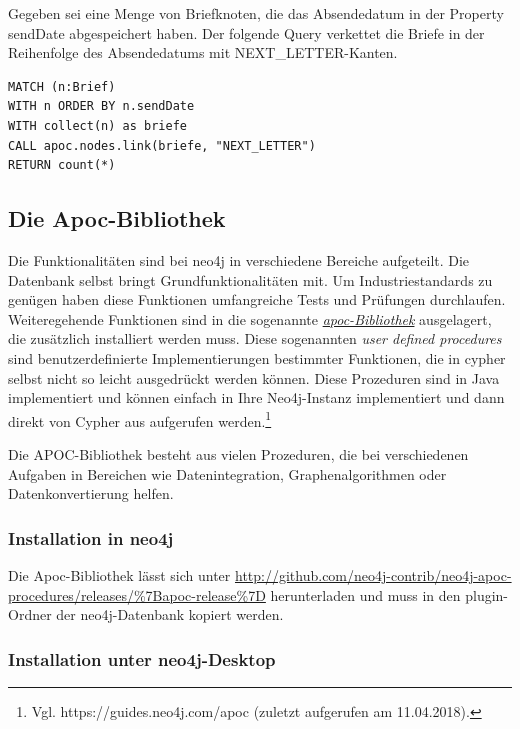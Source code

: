 Gegeben sei eine Menge von Briefknoten, die das Absendedatum in der
Property sendDate abgespeichert haben. Der folgende Query verkettet die
Briefe in der Reihenfolge des Absendedatums mit NEXT\_LETTER-Kanten.

\begin{verbatim}
MATCH (n:Brief)
WITH n ORDER BY n.sendDate
WITH collect(n) as briefe
CALL apoc.nodes.link(briefe, "NEXT_LETTER")
RETURN count(*)
\end{verbatim}

\hypertarget{die-apoc-bibliothek}{%
\subsection{Die Apoc-Bibliothek}\label{die-apoc-bibliothek}}

Die Funktionalitäten sind bei neo4j in verschiedene Bereiche aufgeteilt.
Die Datenbank selbst bringt Grundfunktionalitäten mit. Um
Industriestandards zu genügen haben diese Funktionen umfangreiche Tests
und Prüfungen durchlaufen. Weiteregehende Funktionen sind in die
sogenannte \href{https://guides.neo4j.com/apoc}{\emph{apoc-Bibliothek}}
ausgelagert, die zusätzlich installiert werden muss. Diese sogenannten
\emph{user defined procedures} sind benutzerdefinierte Implementierungen
bestimmter Funktionen, die in cypher selbst nicht so leicht ausgedrückt
werden können. Diese Prozeduren sind in Java implementiert und können
einfach in Ihre Neo4j-Instanz implementiert und dann direkt von Cypher
aus aufgerufen werden.\footnote{Vgl. https://guides.neo4j.com/apoc
  (zuletzt aufgerufen am 11.04.2018).}

Die APOC-Bibliothek besteht aus vielen Prozeduren, die bei verschiedenen
Aufgaben in Bereichen wie Datenintegration, Graphenalgorithmen oder
Datenkonvertierung helfen.

\hypertarget{installation-in-neo4j}{%
\subsubsection{Installation in neo4j}\label{installation-in-neo4j}}

Die Apoc-Bibliothek lässt sich unter
\url{http://github.com/neo4j-contrib/neo4j-apoc-procedures/releases/\%7Bapoc-release\%7D}
herunterladen und muss in den plugin-Ordner der neo4j-Datenbank kopiert
werden.

\hypertarget{installation-unter-neo4j-desktop}{%
\subsubsection{Installation unter
neo4j-Desktop}\label{installation-unter-neo4j-desktop}}

